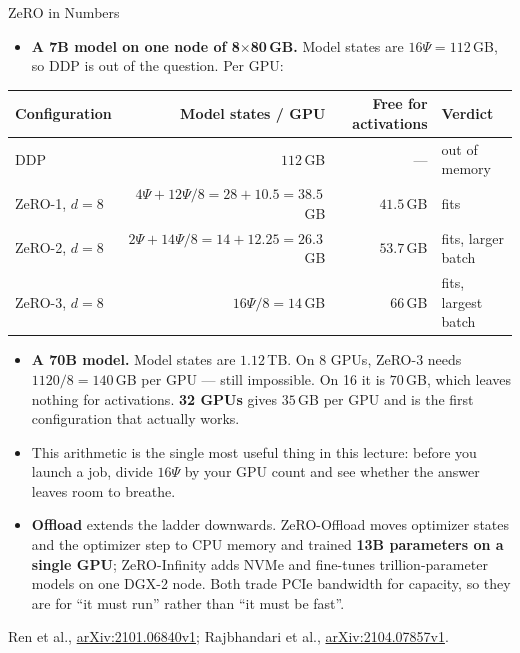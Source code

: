 \begin{frame}{ZeRO in Numbers}
  \begin{itemize}\footnotesize\itemsep0.3em
    \item[\textcolor{red}{$\blacktriangleright$}] \textbf{A 7B model on one node of 8$\times$80\,GB.} Model states are $16\Psi = 112$\,GB, so DDP is out of the question. Per GPU:
  \end{itemize}
  \vspace{0.2em}
  \centering
  \footnotesize
  \begin{tabular}{@{}lrrl@{}}
    \toprule
    \textbf{Configuration} & \textbf{Model states / GPU} & \textbf{Free for activations} & \textbf{Verdict} \\
    \midrule
    DDP                    & $112$\,GB                              & ---              & out of memory \\
    ZeRO-1, $d = 8$        & $4\Psi + 12\Psi/8 = 28 + 10.5 = 38.5$\,GB & $41.5$\,GB    & fits \\
    ZeRO-2, $d = 8$        & $2\Psi + 14\Psi/8 = 14 + 12.25 = 26.3$\,GB & $53.7$\,GB   & fits, larger batch \\
    ZeRO-3, $d = 8$        & $16\Psi/8 = 14$\,GB                    & $66$\,GB         & fits, largest batch \\
    \bottomrule
  \end{tabular}
  \vspace{0.7em}
  \begin{itemize}\footnotesize\itemsep0.25em
    \item[\textcolor{red}{$\blacktriangleright$}] \textbf{A 70B model.} Model states are $1.12$\,TB. On 8 GPUs, ZeRO-3 needs $1120/8 = 140$\,GB per GPU --- still impossible. On 16 it is $70$\,GB, which leaves nothing for activations. \textbf{32 GPUs} gives $35$\,GB per GPU and is the first configuration that actually works.
    \item[\textcolor{red}{$\blacktriangleright$}] This arithmetic is the single most useful thing in this lecture: before you launch a job, divide $16\Psi$ by your GPU count and see whether the answer leaves room to breathe.
    \item[\textcolor{red}{$\blacktriangleright$}] \textbf{Offload} extends the ladder downwards. ZeRO-Offload moves optimizer states and the optimizer step to CPU memory and trained \textbf{13B parameters on a single GPU}; ZeRO-Infinity adds NVMe and fine-tunes trillion-parameter models on one DGX-2 node. Both trade PCIe bandwidth for capacity, so they are for ``it must run'' rather than ``it must be fast''.
  \end{itemize}
  \vspace{0.1em}
  {\scriptsize Ren et al., \href{https://arxiv.org/abs/2101.06840v1}{arXiv:2101.06840v1}; Rajbhandari et al., \href{https://arxiv.org/abs/2104.07857v1}{arXiv:2104.07857v1}.}
\end{frame}

